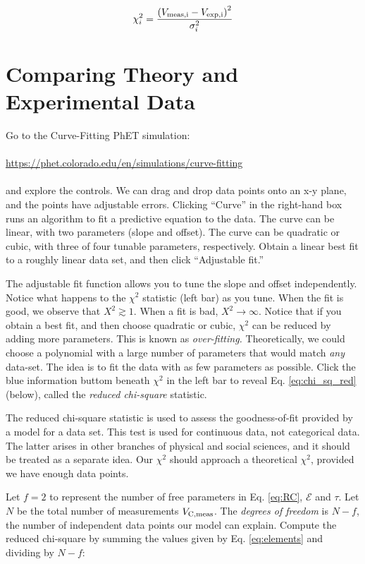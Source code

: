\documentclass[12pt]{article}
\begin{document}
\begin{equation}
\chi_i^2 = \frac{\left(V_{\rm meas,i} - V_{\rm exp,i}\right)^2}{\sigma_i^2} \label{eq:elements}
\end{equation}

\section{Comparing Theory and Experimental Data}

\noindent
Go to the Curve-Fitting PhET simulation: \\ \\
\url{https://phet.colorado.edu/en/simulations/curve-fitting} \\ \\
and explore the controls.  We can drag and drop data points onto an x-y plane, and the points have adjustable errors.  Clicking ``Curve'' in the right-hand box runs an algorithm to fit a predictive equation to the data.  The curve can be linear, with two parameters (slope and offset).  The curve can be quadratic or cubic, with three of four tunable parameters, respectively.  Obtain a linear best fit to a roughly linear data set, and then click ``Adjustable fit.''

The adjustable fit function allows you to tune the slope and offset independently.  Notice what happens to the $\chi^2$ statistic (left bar) as you tune.  When the fit is good, we observe that $X^2 \gtrsim 1$.  When a fit is bad, $X^2 \to \infty$.  Notice that if you obtain a best fit, and then choose quadratic or cubic, $\chi^2$ can be reduced by adding more parameters.  This is known as \textit{over-fitting.}  Theoretically, we could choose a polynomial with a large number of parameters that would match \textit{any} data-set.  The idea is to fit the data with as few parameters as possible.  Click the blue information buttom beneath $\chi^2$ in the left bar to reveal Eq. \ref{eq:chi_sq_red} (below), called the \textit{reduced chi-square} statistic.

The reduced chi-square statistic is used to assess the goodness-of-fit provided by a model for a data set.  This test is used for continuous data, not categorical data.  The latter arises in other branches of physical and social sciences, and it should be treated as a separate idea.  Our $\chi^2$ should approach a theoretical $\chi^2$, provided we have enough data points.

Let $f = 2$ to represent the number of free parameters in Eq. \ref{eq:RC}, $\mathcal{E}$ and $\tau$.  Let $N$ be the total number of measurements $V_{\rm C,meas}$.  The \textit{degrees of freedom} is $N - f$, the number of independent data points our model can explain.  Compute the reduced chi-square by summing the values given by Eq. \ref{eq:elements} and dividing by $N-f$:
\end{document}
